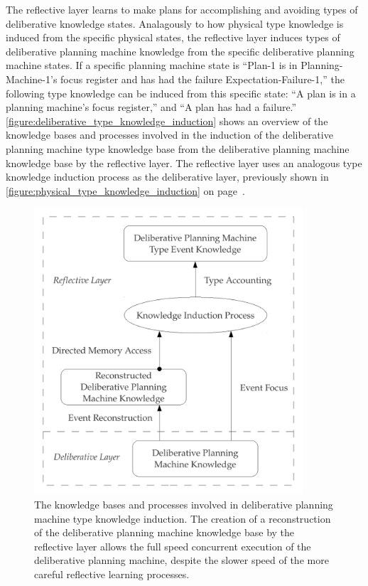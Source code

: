 The reflective layer learns to make plans for accomplishing and
avoiding types of deliberative knowledge states.  Analagously to how
physical type knowledge is induced from the specific physical states,
the reflective layer induces types of deliberative planning machine
knowledge from the specific deliberative planning machine states.  If
a specific planning machine state is ``Plan-1 is in
Planning-Machine-1's focus register and has had the failure
Expectation-Failure-1,'' the following type knowledge can be induced
from this specific state: ``A plan is in a planning machine's focus
register,'' and ``A plan has had a failure.''
{\mbox{\autoref{figure:deliberative_type_knowledge_induction}}} shows
an overview of the knowledge bases and processes involved in the
induction of the deliberative planning machine type knowledge base
from the deliberative planning machine knowledge base by the
reflective layer.  The reflective layer uses an analogous type
knowledge induction process as the deliberative layer, previously
shown in {\mbox{\autoref{figure:physical_type_knowledge_induction}}}
on {\mbox{page~\pageref{figure:physical_type_knowledge_induction}}}.
\begin{figure}[h]
\centering
\includegraphics[width=10cm]{gfx/deliberative_type_knowledge_induction}
\caption[The knowledge bases and processes involved in deliberative
  planning machine type knowledge induction.]{The knowledge bases and
  processes involved in deliberative planning machine type knowledge
  induction.  The creation of a reconstruction of the deliberative
  planning machine knowledge base by the reflective layer allows the
  full speed concurrent execution of the deliberative planning
  machine, despite the slower speed of the more careful reflective
  learning processes.}
\label{figure:deliberative_type_knowledge_induction}
\end{figure}

